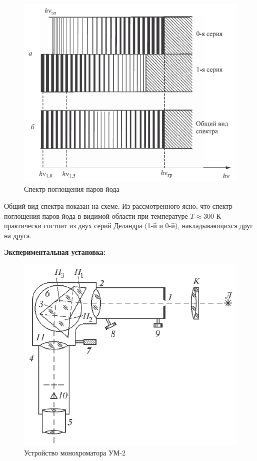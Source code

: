 \documentclass[a4paper, 12pt]{article}%
\begin{document}
	\begin{figure}[h!]
		\centering
		\includegraphics[scale=0.45]{Схема_4.PNG}
		\caption{Спектр поглощения паров йода}
	\end{figure}

	Общий вид спектра показан на схеме.  Из рассмотренного ясно,  что спектр поглощения паров йода в видимой области при температуре $T \approx 300 \text{ К}$ практически состоит из двух серий Деландра (1-й и 0-й),  накладывающихся друг на друга. 
	
\textbf{Экспериментальная установка:}\\\par

	\begin{figure}[h!]
		\centering
		\includegraphics[scale=0.45]{Установка_1.PNG}
		\caption{Устройство монохроматора УМ-2}
	\end{figure}
\end{document}
